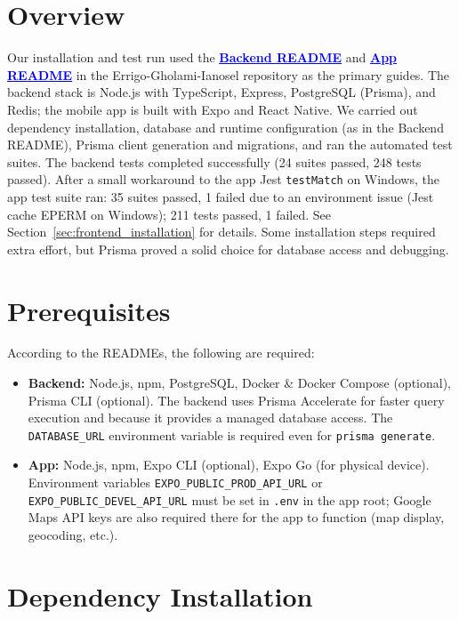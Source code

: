 \section{Overview}
\label{sec:overview}
Our installation and test run used the \href{https://github.com/BIA3IA/Errigo-Gholami-Ianosel/blob/main/IT/CODE/BACKEND/README.md}{\textbf{\textcolor{blue}{\underline{Backend README}}}} and \href{https://github.com/BIA3IA/Errigo-Gholami-Ianosel/blob/main/IT/CODE/APP/README.md}{\textbf{\textcolor{blue}{\underline{App README}}}} in the Errigo-Gholami-Ianosel repository as the primary guides. The backend stack is Node.js with TypeScript, Express, PostgreSQL (Prisma), and Redis; the mobile app is built with Expo and React Native. We carried out dependency installation, database and runtime configuration (as in the Backend README), Prisma client generation and migrations, and ran the automated test suites. The backend tests completed successfully (24 suites passed, 248 tests passed). After a small workaround to the app Jest \texttt{testMatch} on Windows, the app test suite ran: 35 suites passed, 1 failed due to an environment issue (Jest cache EPERM on Windows); 211 tests passed, 1 failed. See Section~\ref{sec:frontend_installation} for details. Some installation steps required extra effort, but Prisma proved a solid choice for database access and debugging.

\section{Prerequisites}
\label{sec:prerequisites}
According to the READMEs, the following are required:
\begin{itemize}
    \item \textbf{Backend:} Node.js, npm, PostgreSQL, Docker \& Docker Compose (optional), Prisma CLI (optional). The backend uses Prisma Accelerate for faster query execution and because it provides a managed database access. The \texttt{DATABASE\_URL} environment variable is required even for \texttt{prisma generate}.
    \item \textbf{App:} Node.js, npm, Expo CLI (optional), Expo Go (for physical device). Environment variables \texttt{EXPO\_PUBLIC\_PROD\_API\_URL} or \texttt{EXPO\_PUBLIC\_DEVEL\_API\_URL} must be set in \texttt{.env} in the app root; Google Maps API keys are also required there for the app to function (map display, geocoding, etc.).
\end{itemize}

\section{Dependency Installation}
\label{sec:dependency_installation}


